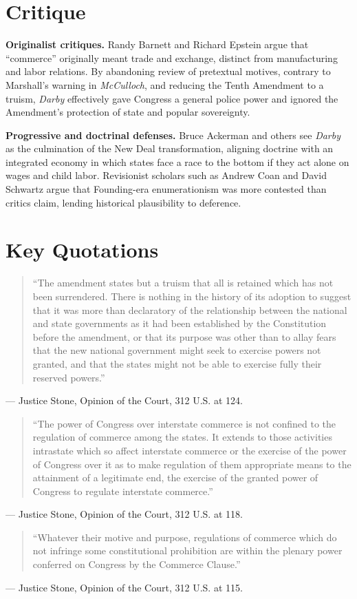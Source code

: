 \documentclass[12pt]{article}
\begin{document}
\section{Critique}

\textbf{Originalist critiques.} Randy Barnett and Richard Epstein argue that ``commerce'' originally meant trade and exchange, distinct from manufacturing and labor relations. By abandoning review of pretextual motives, contrary to Marshall's warning in \textit{McCulloch}, and reducing the Tenth Amendment to a truism, \textit{Darby} effectively gave Congress a general police power and ignored the Amendment's protection of state and popular sovereignty.

\textbf{Progressive and doctrinal defenses.} Bruce Ackerman and others see \textit{Darby} as the culmination of the New Deal transformation, aligning doctrine with an integrated economy in which states face a race to the bottom if they act alone on wages and child labor. Revisionist scholars such as Andrew Coan and David Schwartz argue that Founding-era enumerationism was more contested than critics claim, lending historical plausibility to deference.

\section{Key Quotations}

\begin{quote}
``The amendment states but a truism that all is retained which has not been surrendered. There is nothing in the history of its adoption to suggest that it was more than declaratory of the relationship between the national and state governments as it had been established by the Constitution before the amendment, or that its purpose was other than to allay fears that the new national government might seek to exercise powers not granted, and that the states might not be able to exercise fully their reserved powers.''
\end{quote}
\noindent --- Justice Stone, Opinion of the Court, 312 U.S. at 124.

\begin{quote}
``The power of Congress over interstate commerce is not confined to the regulation of commerce among the states. It extends to those activities intrastate which so affect interstate commerce or the exercise of the power of Congress over it as to make regulation of them appropriate means to the attainment of a legitimate end, the exercise of the granted power of Congress to regulate interstate commerce.''
\end{quote}
\noindent --- Justice Stone, Opinion of the Court, 312 U.S. at 118.

\begin{quote}
``Whatever their motive and purpose, regulations of commerce which do not infringe some constitutional prohibition are within the plenary power conferred on Congress by the Commerce Clause.''
\end{quote}
\noindent --- Justice Stone, Opinion of the Court, 312 U.S. at 115.
\end{document}
